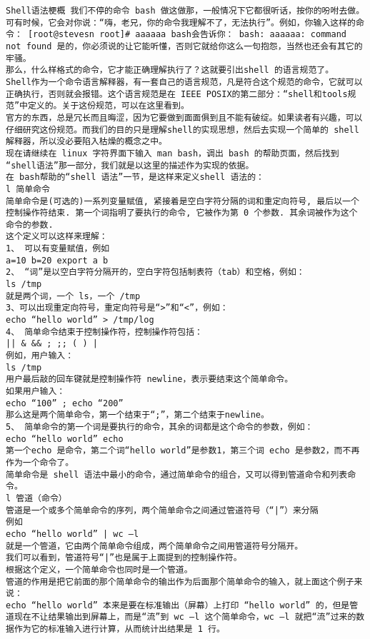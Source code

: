 \begin{lstlisting}
Shell语法梗概 我们不停的命令 bash 做这做那，一般情况下它都很听话，按你的吩咐去做。可有时候，它会对你说：“嗨，老兄，你的命令我理解不了，无法执行”。例如，你输入这样的命令： [root@stevesn root]# aaaaaa bash会告诉你： bash: aaaaaa: command not found 是的，你必须说的让它能听懂，否则它就给你这么一句抱怨，当然也还会有其它的牢骚。 
那么，什么样格式的命令，它才能正确理解执行了？这就要引出shell 的语言规范了。 
Shell作为一个命令语言解释器，有一套自己的语言规范，凡是符合这个规范的命令，它就可以正确执行，否则就会报错。这个语言规范是在 IEEE POSIX的第二部分：“shell和tools规范”中定义的。关于这份规范，可以在这里看到。 
官方的东西，总是冗长而且晦涩，因为它要做到面面俱到且不能有破绽。如果读者有兴趣，可以仔细研究这份规范。而我们的目的只是理解shell的实现思想，然后去实现一个简单的 shell 解释器，所以没必要陷入枯燥的概念之中。 
现在请继续在 linux 字符界面下输入 man bash，调出 bash 的帮助页面，然后找到 “shell语法”那一部分，我们就是以这里的描述作为实现的依据。 
在 bash帮助的“shell 语法”一节，是这样来定义shell 语法的： 
l 简单命令 
简单命令是(可选的)一系列变量赋值, 紧接着是空白字符分隔的词和重定向符号, 最后以一个控制操作符结束. 第一个词指明了要执行的命令, 它被作为第 0 个参数. 其余词被作为这个命令的参数. 
这个定义可以这样来理解： 
1、 可以有变量赋值，例如 
a=10 b=20 export a b 
2、 “词”是以空白字符分隔开的，空白字符包括制表符（tab）和空格，例如： 
ls /tmp 
就是两个词，一个 ls，一个 /tmp 
3、可以出现重定向符号，重定向符号是“>”和“<”，例如： 
echo “hello world” > /tmp/log 
4、 简单命令结束于控制操作符，控制操作符包括： 
|| & && ; ;; ( ) | 
例如，用户输入： 
ls /tmp 
用户最后敲的回车键就是控制操作符 newline，表示要结束这个简单命令。 
如果用户输入： 
echo “100” ; echo “200” 
那么这是两个简单命令，第一个结束于“;”，第二个结束于newline。 
5、 简单命令的第一个词是要执行的命令，其余的词都是这个命令的参数，例如： 
echo “hello world” echo 
第一个echo 是命令，第二个词“hello world”是参数1，第三个词 echo 是参数2，而不再作为一个命令了。 
简单命令是 shell 语法中最小的命令，通过简单命令的组合，又可以得到管道命令和列表命令。 
l 管道（命令） 
管道是一个或多个简单命令的序列，两个简单命令之间通过管道符号（“|”）来分隔 
例如 
echo “hello world” | wc –l 
就是一个管道，它由两个简单命令组成，两个简单命令之间用管道符号分隔开。 
我们可以看到，管道符号“|”也是属于上面提到的控制操作符。 
根据这个定义，一个简单命令也同时是一个管道。 
管道的作用是把它前面的那个简单命令的输出作为后面那个简单命令的输入，就上面这个例子来说： 
echo “hello world” 本来是要在标准输出（屏幕）上打印 “hello world” 的，但是管道现在不让结果输出到屏幕上，而是“流”到 wc –l 这个简单命令，wc –l 就把“流”过来的数据作为它的标准输入进行计算，从而统计出结果是 1 行。 

\end{lstlisting}
